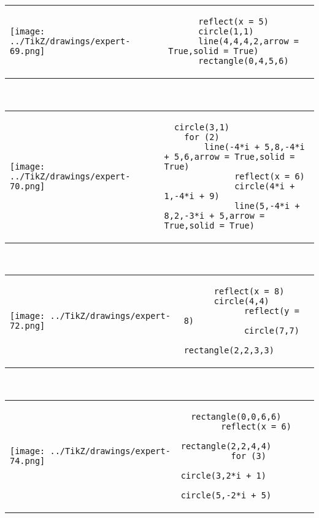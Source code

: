             \begin{tabular}{ll}
    \texttt{[image: ../TikZ/drawings/expert-69.png]}&
    
        \begin{minipage}{10cm}
        \begin{verbatim}
      reflect(x = 5)
      circle(1,1)
      line(4,4,4,2,arrow = True,solid = True)
      rectangle(0,4,5,6)
        \end{verbatim}
\end{minipage}

    \end{tabular}        
            \\

            \begin{tabular}{ll}
    \texttt{[image: ../TikZ/drawings/expert-70.png]}&
    
        \begin{minipage}{10cm}
        \begin{verbatim}
  circle(3,1)
    for (2)
        line(-4*i + 5,8,-4*i + 5,6,arrow = True,solid = True)
              reflect(x = 6)
              circle(4*i + 1,-4*i + 9)
              line(5,-4*i + 8,2,-3*i + 5,arrow = True,solid = True)
        \end{verbatim}
\end{minipage}

    \end{tabular}        
            \\

            \begin{tabular}{ll}
    \texttt{[image: ../TikZ/drawings/expert-72.png]}&
    
        \begin{minipage}{10cm}
        \begin{verbatim}
      reflect(x = 8)
      circle(4,4)
            reflect(y = 8)
            circle(7,7)
            rectangle(2,2,3,3)
        \end{verbatim}
\end{minipage}

    \end{tabular}        
            \\

            \begin{tabular}{ll}
    \texttt{[image: ../TikZ/drawings/expert-74.png]}&
    
        \begin{minipage}{10cm}
        \begin{verbatim}
  rectangle(0,0,6,6)
        reflect(x = 6)
        rectangle(2,2,4,4)
          for (3)
              circle(3,2*i + 1)
              circle(5,-2*i + 5)
        \end{verbatim}
\end{minipage}

    \end{tabular}        
            \\

